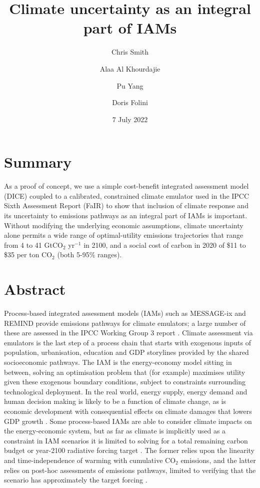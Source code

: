 \documentclass{article}
\title{Climate uncertainty as an integral part of IAMs}
\author[1,3]{Chris Smith}
\author[2,3]{Alaa Al Khourdajie}
\author[4]{Pu Yang}
\author[5]{Doris Folini}
\affil[1]{University of Leeds, UK}
\affil[2]{Imperial College London, UK}
\affil[3]{International Institute for Applied Systems Analysis, Austria}
\affil[4]{University College London, UK}
\affil[5]{ETH Zürich, Switzerland}
\date{7 July 2022}
\begin{document}
\maketitle

\section*{Summary}

As a proof of concept, we use a simple cost-benefit integrated assessment model (DICE) coupled to a calibrated, constrained climate emulator used in the IPCC Sixth Assessment Report (FaIR) to show that inclusion of climate response and its uncertainty to emissions pathways as an integral part of IAMs is important. Without modifying the underlying economic assumptions, climate uncertainty alone permits a wide range of optimal-utility emissions trajectories that range from 4 to 41 GtCO$_2$ yr$^{-1}$ in 2100, and a social cost of carbon in 2020 of \$11 to \$35 per ton CO$_2$ (both 5-95\% ranges). 

\section*{Abstract}

Process-based integrated assessment models (IAMs) such as MESSAGE-ix and REMIND provide emissions pathways for climate emulators; a large number of these are assessed in the IPCC Working Group 3 report \citep{Kikstra2022,Riahi2022}. Climate assessment via emulators is the last step of a process chain that starts with exogenous inputs of population, urbanisation, education and GDP storylines provided by the shared socioeconomic pathways. The IAM is the energy-economy model sitting in between, solving an optimisation problem that (for example) maximises utility given these exogenous boundary conditions, subject to constraints surrounding technological deployment. In the real world, energy supply, energy demand and human decision making is likely to be a function of climate change, as is economic development with consequential effects on climate damages that lowers GDP growth \citep{Rising2022}. Some process-based IAMs are able to consider climate impacts on the energy-economic system, but as far as climate is implicitly used as a constraint in IAM scenarios it is limited to solving for a total remaining carbon budget \citep{Riahi2022} or year-2100 radiative forcing target \citep{ONeill2016}. The former relies upon the linearity and time-independence of warming with cumulative CO$_2$ emissions, and the latter relies on post-hoc assessments of emissions pathways, limited to verifying that the scenario has approximately the target forcing \citep{Gidden2019}. 
\end{document}

